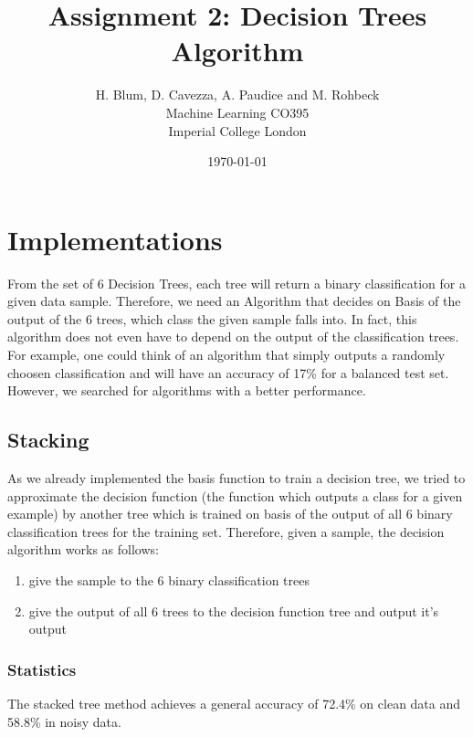 \documentclass{article}
\begin{document}
\author{H. Blum, D. Cavezza, A. Paudice and M. Rohbeck\\
 Machine Learning CO395\\
  Imperial College London}
\date{\today}
\title{Assignment 2: Decision Trees Algorithm}
\maketitle

\begin{abstract}
\lipsum[5]
\end{abstract}

\section{Implementations}
From the set of 6 Decision Trees, each tree will return a binary classification for a given data sample. Therefore, we need an Algorithm that decides on Basis of the output of the 6 trees, which class the given sample falls into. In fact, this algorithm does not even have to depend on the output of the classification trees. For example, one could think of an algorithm that simply outputs a randomly choosen classification and will have an accuracy of 17\% for a balanced test set. However, we searched for algorithms with a better performance.


\subsection{Stacking}
As we already implemented the basis function to train a decision tree, we tried to approximate the decision function (the function which outputs a class for a given example) by another tree which is trained on basis of the output of all 6 binary classification trees for the training set.
Therefore, given a sample, the decision algorithm works as follows:
\begin{enumerate}
    \item give the sample to the 6 binary classification trees
    \item give the output of all 6 trees to the decision function tree and output it's output
\end{enumerate} 

\subsubsection{Statistics}
The stacked tree method achieves a general accuracy of 72.4\% on clean data and 58.8\% in noisy data.
\end{document}
